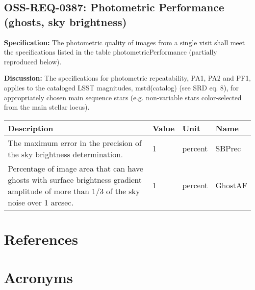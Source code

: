 \documentclass[SE,authoryear,toc]{lsstdoc}
\begin{document}
\subsection{OSS-REQ-0387: Photometric Performance (ghosts, sky brightness)}  \label{sec:photometric}

\textbf{Specification:} The photometric quality of images from a single visit shall meet the specifications listed in the table photometricPerformance (partially reproduced below).

\textbf{Discussion:} The specifications for photometric repeatability, PA1, PA2 and PF1, applies to the cataloged LSST magnitudes, mstd(catalog) (see SRD eq. 8), for appropriately chosen main sequence stars (e.g. non-variable stars color-selected from the main stellar locus).

\begin{center}
\begin{tabular}{p{}p{}p{}p{}}\hline
    \textbf{Description} & \textbf{Value} & \textbf{Unit} & \textbf{Name} \\\hline
    The maximum error in the precision of the sky brightness determination. & 1 & percent & SBPrec \\\hline
    Percentage of image area that can have ghosts with surface brightness gradient amplitude of more than 1/3 of the sky noise over 1 arcsec. & 1 & percent & GhostAF \\\hline
\end{tabular}
\end{center}

\appendix
\section{References} \label{sec:bib}
\renewcommand{\refname}{} %


\section{Acronyms} \label{sec:acronyms}

\end{document}
